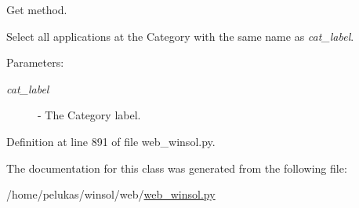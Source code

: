 Get method. 

Select all applications at the Category with the same name as {\em cat\_\-label\/}.

\begin{Desc}
\item[Parameters:]
\begin{description}
\item[{\em cat\_\-label}]- The Category label. \end{description}
\end{Desc}


Definition at line 891 of file web\_\-winsol.py.

The documentation for this class was generated from the following file:\begin{CompactItemize}
\item 
/home/pelukas/winsol/web/\hyperlink{web__winsol_8py}{web\_\-winsol.py}\end{CompactItemize}
